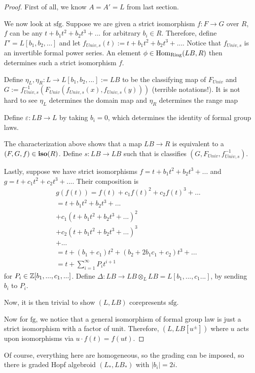 \begin{proof}
    First of all, we know $A=A'=L$ from last section. 

    We now look at $\mathrm{sfg}$.  Suppose we are given a strict isomorphism $f: F\to G$ over $R$, $f$ can be any $t+b_1t^2+b_2t^3+...$ for arbitrary $b_i\in R$. Therefore, define $\Gamma'=L[b_1,b_2,...]$ and let $f_{Univ,s}(t):=t+b_1t^2+b_2t^3+...$. Notice that $f_{Univ,s}$ is an invertible formal power series. An element $\phi \in \operatorname{Hom}_{\mathrm{Ring}}(LB, R)$  then determines such a strict isomorphism $f$.
    
    Define $\eta_L, \eta_R: L\to L[b_1,b_2,...]:=LB$ to be the classifying map of $F_{Univ}$ and $G:=f_{Univ,s}^{-1}(F_{Univ}(f_{Univ,s}(x), f_{Univ,s}(y)))$ (terrible notations!). It is not hard to see $\eta_L$ determines the domain map and $\eta_R$ determines the range map
    
    Define $\varepsilon:LB\to L$ by taking $b_i=0$, which determines the identity of formal group laws.

    The characterization above shows that a map $LB\to R$ is equivalent to a $(F,G,f)\in \operatorname{\mathbf{iso}}(R)$. Define $s: LB\to LB$ such that is classifies $(G, F_{Univ}, f^{-1}_{Univ,s})$.

    Lastly, suppose we have strict isomorphisms $f=t+b_1t^2+b_2t^3+...$ and $g=t+c_1t^2+c_2t^3+...$. Their composition is 
    \begin{align*}
        g(f(t))=f(t)+c_1f(t)^2+c_2f(t)^3+...
        \\=t+b_1t^2+b_2t^3+...
        \\+c_1(t+b_1t^2+b_2t^3+...)^2
        \\+ c_2(t+b_1t^2+b_2t^3+...)^3
        \\+...
        \\=t+ (b_1+c_1)t^2+(b_2+2b_1c_1+c_2)t^3+ ...
        \\=t+\sum_{i=1}^\infty P_i t^{i+1}
    \end{align*}for $P_i \in \mathbb{Z}[b_1,...,c_1,...]$. Define $\Delta: LB\to LB\otimes_{L}LB=L[b_1,...,c_1...]$, by sending $b_i$ to $P_i$.

    Now, it is then trivial to show $(L, LB)$ corepresents $\mathrm{sfg}$.

    Now for $\mathrm{fg}$, we notice that a general isomorphism of formal group law is just a strict isomorphism with a factor of unit. Therefore, $(L,LB[u^{\pm}])$ where $u$ acts upon isomorphisms via $u\cdot f(t)= f(ut)$.
\end{proof}
Of course, everything here are homogeneous, so the grading can be imposed, so there is graded Hopf algebroid $(L_*,L B_*)$  with $|b_i|=2i$.

